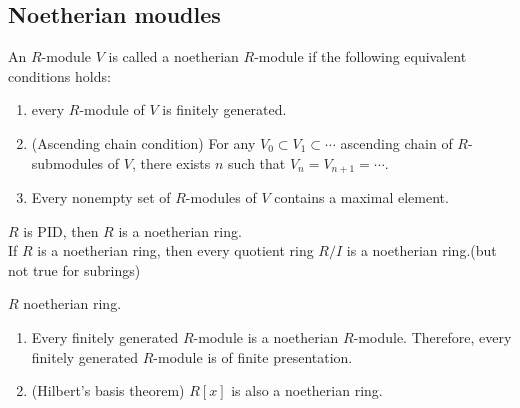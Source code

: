 \subsection{Noetherian moudles}
\begin{definition}
    An  $ R  $-module  $ V  $ is called a noetherian  $ R  $-module if the following equivalent conditions holds:
    \begin{enumerate}
        \item every  $ R  $-module of  $ V  $ is finitely generated.
        \item (Ascending chain condition) For any  $ V_0\subset V_1\subset \cdots $ ascending chain of  $ R  $-submodules of  $ V  $, there exists  $ n  $ such that  $ V_n=V_{n+1}=\cdots  $.\
        \item Every nonempty set of  $ R  $-modules of  $ V  $ contains a maximal element. 
    \end{enumerate}
\end{definition}
\begin{proposition}
     $ R  $ is PID, then  $ R  $ is a noetherian ring.\\
     If  $ R  $ is a noetherian ring, then every quotient ring  $ R/I  $ is a noetherian ring.(but not true for subrings)
\end{proposition}
\begin{theorem}
     $ R  $ noetherian ring.
     \begin{enumerate}
        \item Every finitely generated  $ R  $-module is a noetherian  $ R  $-module. Therefore, every finitely generated  $ R  $-module is of finite presentation.
        \item (Hilbert's basis theorem) $ R[x]  $ is also a noetherian ring. 
     \end{enumerate}
\end{theorem}
